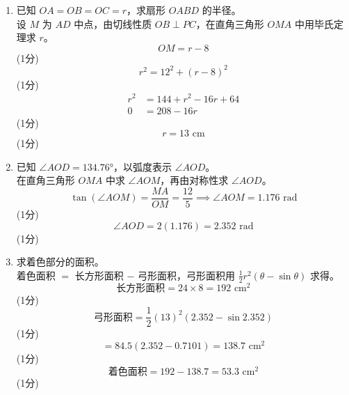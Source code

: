 \documentclass[12pt,a4paper]{exam-zh}
\begin{document}
\begin{solution}
    \begin{enumerate}[label=(\alph*)]
        \item 已知 $OA=OB=OC=r$，求扇形 $OABD$ 的半径。 \\
        设 $M$ 为 $AD$ 中点，由切线性质 $OB\perp PC$，在直角三角形 $OMA$ 中用毕氏定理求 $r$。
        \[
            OM = r - 8
        \]
        \hfill (1分)
        \[
            r^2 = 12^2 + (r-8)^2
        \]
        \hfill (1分)
        \begin{align*}
            r^2 &= 144 + r^2 - 16r + 64 \\
            0 &= 208 - 16r
        \end{align*}
        \hfill (1分)
        \[
            r = 13 \text{ cm}
        \]
        \hfill (1分)

        \item 已知 $\angle AOD = 134.76°$，以弧度表示 $\angle AOD$。 \\
        在直角三角形 $OMA$ 中求 $\angle AOM$，再由对称性求 $\angle AOD$。
        \[
            \tan(\angle AOM) = \frac{MA}{OM} = \frac{12}{5} \implies \angle AOM = 1.176 \text{ rad}
        \]
        \hfill (1分)
        \[
            \angle AOD = 2(1.176) = 2.352 \text{ rad}
        \]
        \hfill (1分)

        \item 求着色部分的面积。 \\
        着色面积 $=$ 长方形面积 $-$ 弓形面积，弓形面积用 $\frac{1}{2}r^2(\theta-\sin\theta)$ 求得。
        \[
            \text{长方形面积} = 24 \times 8 = 192 \text{ cm}^2
        \]
        \hfill (1分)
        \[
            \text{弓形面积} = \frac{1}{2}(13)^2(2.352 - \sin 2.352)
        \]
        \hfill (1分)
        \[
            = 84.5(2.352-0.7101) = 138.7 \text{ cm}^2
        \]
        \hfill (1分)
        \[
            \text{着色面积} = 192 - 138.7 = 53.3 \text{ cm}^2
        \]
        \hfill (1分)
    \end{enumerate}
\end{solution}
\end{document}
